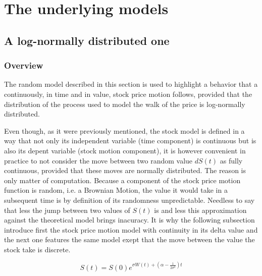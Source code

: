 \documentclass[12pt]{report}
\newcommand{\lnorm}{log-normally }
\newcommand{\Bm}{W\left(t\right)}
\newcommand{\St}{S\left(t\right)}
\newcommand{\Si}{S\left(0\right)}
\newcommand{\dSt}{dS\left(t\right)}
\newcommand{\Scontinuous}{\St = \Si e^{\sigma\Bm + \left(\alpha - \frac{1}{2 \sigma^2}\right)t}}
\begin{document}
\chapter{The underlying models}
\label{cha:The underlying models}


\section{A log-normally distributed one}
\label{sec:A log-normally distributed one}

\subsection{Overview}
\label{sub:Overview}
The random model described in this section is used to highlight a behavior that  a continuously, in time and in value, stock price motion follows, provided that the distribution of the process used to model the walk of the price is  \lnorm distributed. 

Even though, as it were previously mentioned, the stock model is defined in 
a way that not only its independent variable (time component) is continuous but
is also its depent variable (stock motion component),
it is however convenient in practice to not consider the move between two random
value $\dSt$ as fully continuous, provided that these moves are normally 
distributed.
The reason is only matter of computation. Because a component of the stock
price motion function is random, i.e. a Brownian Motion, the value it would
take in a subsequent time is by definition of its randomness unpredictable.
Needless to say that less the jump between two values of $\St$ is and less
this approximation against the theoretical model brings inacuracy.
It is why the following subsection introduce first the stock price motion model
with continuity in its delta value and the next one features the same model 
exept that the move between the value the stock take is discrete.

\begin{center}
\begin{equation}
\Scontinuous
\label{eq:Scontinuous}
\end{equation}
\end{center}
\end{document}
